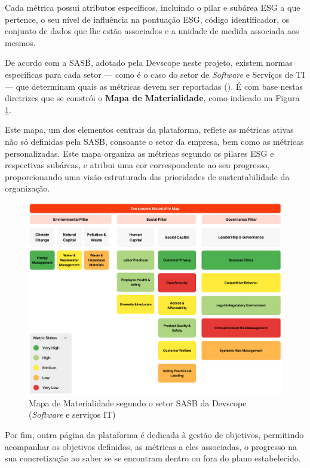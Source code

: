 Cada métrica possui atributos específicos, incluindo o pilar e subárea ESG a que pertence, o seu nível de influência na pontuação ESG, código identificador, os conjunto de dados que lhe estão associados e a unidade de medida associada aos mesmos.

De acordo com a \gls{SASB}, adotado pela Devscope neste projeto, existem normas específicas para cada setor — como é o caso do setor de \textit{Software} e Serviços de TI — que determinam quais as métricas devem ser reportadas (\cite{SASBSector2025}). É com base nestas diretrizes que se constrói o \textbf{Mapa de Materialidade}, como indicado na Figura \ref{fig:materiality_map}.

Este mapa, um dos elementos centrais da plataforma, reflete as métricas ativas não só definidas pela \gls{SASB}, consoante o setor da empresa, bem como as métricas personalizadas. Este mapa organiza as métricas segundo os pilares ESG e respectivas subáreas, e atribui uma cor correspondente ao seu progresso, proporcionando uma visão estruturada das prioridades de sustentabilidade da organização.

\begin{figure}[h]
    \centering
    \includegraphics[width=\linewidth]{frontmatter/assets/mapa-materialidade.png}
    \caption{Mapa de Materialidade segundo o setor SASB da Devscope (\textit{Software} e serviços IT)}
    \label{fig:materiality_map}
\end{figure}

Por fim, outra página da plataforma é dedicada à gestão de objetivos, permitindo acompanhar os objetivos definidos, as métricas a eles associadas, o progresso na sua concretização ao saber se se encontram dentro ou fora do plano estabelecido.

